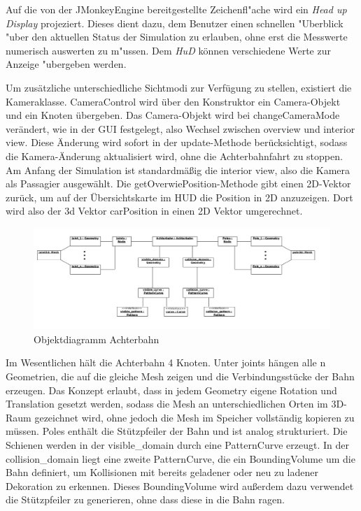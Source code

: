 Auf die von der JMonkeyEngine bereitgestellte Zeichenfl"ache wird ein \textsl{Head up Display} projeziert. Dieses dient dazu, dem Benutzer einen schnellen 
"Uberblick "uber den aktuellen Status der Simulation zu erlauben, ohne erst die Messwerte numerisch auswerten zu m"ussen. Dem \textsl{HuD} können verschiedene Werte zur
Anzeige "ubergeben werden.

Um zusätzliche unterschiedliche Sichtmodi zur Verfügung zu stellen, existiert die Kameraklasse. CameraControl wird über den Konstruktor ein Camera-Objekt und ein Knoten übergeben. Das Camera-Objekt wird bei changeCameraMode verändert, wie in der GUI festgelegt, also Wechsel zwischen overview und interior view. Diese Änderung wird sofort in der update-Methode berücksichtigt, sodass die Kamera-Änderung aktualisiert wird, ohne die Achterbahnfahrt zu stoppen. Am Anfang der Simulation ist standardmäßig die interior view, also die Kamera als Passagier ausgewählt. Die getOverwiePosition-Methode gibt einen 2D-Vektor zurück, um auf der Übersichtskarte im HUD die Position in 2D anzuzeigen. Dort wird also der 3d Vektor carPosition in einen 2D Vektor umgerechnet.

\begin{figure}
\includegraphics[width=\linewidth]{bilder/objektdiagramm_004}
\caption{Objektdiagramm Achterbahn}
\label{fig:achterbahnObjects}
\end{figure}

Im Wesentlichen hält die Achterbahn 4 Knoten. Unter joints hängen alle n Geometrien, die auf die gleiche Mesh zeigen und die Verbindungsstücke der Bahn erzeugen. Das Konzept erlaubt, dass in jedem Geometry eigene Rotation und Translation gesetzt werden, sodass die Mesh an unterschiedlichen Orten im 3D-Raum gezeichnet wird, ohne jedoch die Mesh im Speicher vollständig kopieren zu müssen. Poles enthält die Stützpfeiler der Bahn und ist analog strukturiert.
Die Schienen werden in der visible\_domain durch eine PatternCurve erzeugt. In der collision\_domain liegt eine zweite PatternCurve, die ein BoundingVolume um die Bahn definiert, um Kollisionen mit bereits geladener oder neu zu ladener Dekoration zu erkennen. Dieses BoundingVolume wird außerdem dazu verwendet die Stützpfeiler zu generieren, ohne dass diese in die Bahn ragen.

